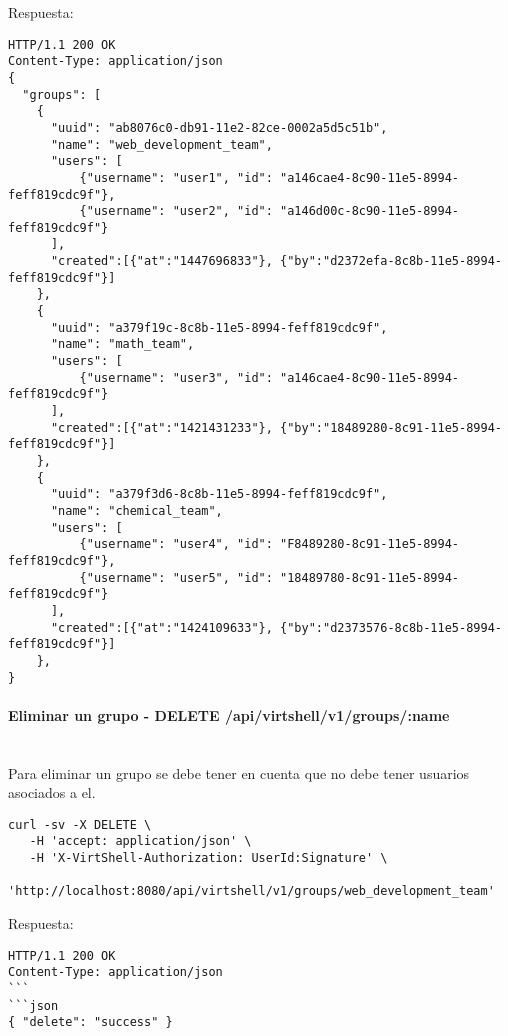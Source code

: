 \vspace{1cm}
Respuesta:
\vspace{1cm}

\begin{lstlisting}[style=json]
HTTP/1.1 200 OK
Content-Type: application/json
{
  "groups": [
    {
      "uuid": "ab8076c0-db91-11e2-82ce-0002a5d5c51b",
      "name": "web_development_team",
      "users": [ 
          {"username": "user1", "id": "a146cae4-8c90-11e5-8994-feff819cdc9f"},
          {"username": "user2", "id": "a146d00c-8c90-11e5-8994-feff819cdc9f"}
      ],     
      "created":[{"at":"1447696833"}, {"by":"d2372efa-8c8b-11e5-8994-feff819cdc9f"}]
    },
    {
      "uuid": "a379f19c-8c8b-11e5-8994-feff819cdc9f",
      "name": "math_team",
      "users": [ 
          {"username": "user3", "id": "a146cae4-8c90-11e5-8994-feff819cdc9f"}
      ],     
      "created":[{"at":"1421431233"}, {"by":"18489280-8c91-11e5-8994-feff819cdc9f"}]
    },
    {
      "uuid": "a379f3d6-8c8b-11e5-8994-feff819cdc9f",
      "name": "chemical_team",
      "users": [ 
          {"username": "user4", "id": "F8489280-8c91-11e5-8994-feff819cdc9f"},
          {"username": "user5", "id": "18489780-8c91-11e5-8994-feff819cdc9f"}
      ],       
      "created":[{"at":"1424109633"}, {"by":"d2373576-8c8b-11e5-8994-feff819cdc9f"}]
    },        
}  
\end{lstlisting}

\paragraph{Eliminar un grupo - DELETE /api/virtshell/v1/groups/:name} ~\\

Para eliminar un grupo se debe tener en cuenta que no debe tener usuarios asociados a el.

\begin{lstlisting}[style=json]
curl -sv -X DELETE \
   -H 'accept: application/json' \
   -H 'X-VirtShell-Authorization: UserId:Signature' \
   'http://localhost:8080/api/virtshell/v1/groups/web_development_team'
\end{lstlisting}

\vspace{1cm}
Respuesta:
\vspace{1cm}

\begin{lstlisting}[style=json]
HTTP/1.1 200 OK
Content-Type: application/json
```
```json
{ "delete": "success" }
\end{lstlisting}
